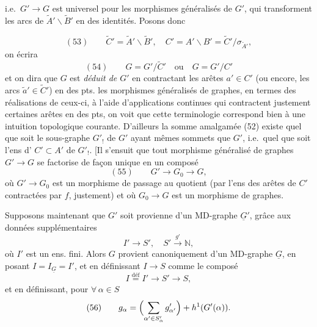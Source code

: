 \documentclass[11pt,a4paper]{article}
\begin{document}

i.e.\ $G' \to G$ est universel pour les morphismes généralisés de   $G'$, qui transforment les arcs de $\widetilde{A}' \smallsetminus \widetilde{B}'$ en des identités. Posons donc

\[
(53)\qquad \widetilde{C}' = \widetilde{A}' \smallsetminus \widetilde{B}', \quad C' = A' \smallsetminus B' = \widetilde{C}'/\sigma_{\widetilde{A}'},
\]
on écrira
\[
(54)\qquad G = G'/\widetilde{C}' \quad\text{ou}\quad G = G'/C'
\]
et on dira que $G$ est \emph{déduit de $G'$} en contractant les arêtes $a' \in C'$ (ou encore, les arcs $\tilde{a}' \in \widetilde{C}'$) en des pts.  les morphismes généralisés de graphes, en termes des réalisations   de ceux-ci, à l'aide d'applications continues qui contractent justement certaines arêtes en des pts, on voit que cette terminologie correspond bien à une intuition topologique courante. D'ailleurs la somme amalgamée (52) existe quel que soit le sous-graphe $G'_{!}$ de $G'$ ayant mêmes sommets que $G'$, i.e.\ quel que soit l'ens d'  $C' \subset A'$ de $G'_{!}$. [Il s'ensuit que tout morphisme généralisé de graphes $G' \to G$ se factorise de façon unique en un
composé
\[
(55)\qquad G' \to G_0 \to G,
\]
où $G' \to G_0$ est un morphisme de passage au quotient (par l'ens des arêtes de $C'$ contractées par $f$, justement) et où $G_0 \to G$ est un morphisme  de graphes.


Supposons maintenant que $G'$ soit \struck{\ill{}}  provienne\add{\ill{}} d'un MD-graphe $\underline{G}'$, grâce aux données supplémentaires
\[
I' \to S', \quad S' \xrightarrow{g'} \mathbb{N},
\]
où $I'$ est un ens. fini. Alors $G$ provient canoniquement d'un MD-graphe $\underline{G}$, en posant $I = I_{\underline{G}} = I'$, et en définissant $I \to S$ comme le composé
\[
I \overset{\text{déf}}{=} I' \to S' \to S,
\]
et en définissant, pour $\forall\, \alpha \in S$
\[
(56)\qquad g_\alpha = \Bigl(\sum_{\alpha' \in S'_\alpha} g'_{\alpha'}\Bigr) + h^1(G'(\alpha)).
\]
\end{document}
